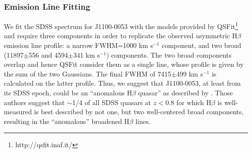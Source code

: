 \documentclass[a4paper,fleqn,usenatbib]{mnras}
\begin{document}
\subsubsection{Emission Line Fitting} 
We fit the SDSS spectrum for J1100-0053 with the models provided by
QSFit\footnote{http://qsfit.inaf.it/}\citep{Calderone2017} and require
three components in order to replicate the observed asymmetric
H$\beta$ emission line profile: a narrow FWHM=1000 km s$^{-1}$
component, and two broad (11897$\pm$556 and 4594$\pm$341 km s$^{-1}$)
components. The two broad components overlap and hence QSFit consider
them as a single line, whose profile is given by the sum of the two
Gaussians. The final FWHM of 7415$\pm$499 km s$^{-1}$ is calculated on
the latter profile.  Thus, we suggest that J1100-0053, at least from
its SDSS epoch, could be an ``anomalous H$\beta$ quasar'' as described
by \citet{Steinhardt_Silverman2013}. Those authors suggest that
$\sim$1/4 of all SDSS quasars at $z < 0.8$ for which H$\beta$ is
well-measured is best described by not one, but two well-centered
broad components, resulting in the ``anomalous'' broadened H$\beta$
lines.
\end{document}

